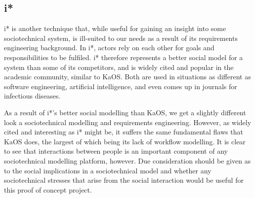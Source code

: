 \subsection{i*} %
i* is another technique that, while useful for gaining an insight into some sociotechnical system, is ill-suited to our needs as a result of its requirements engineering background\cite{Werneck2009}. In i*, actors rely on each other for goals and responsibilities to be fulfiled. i* therefore represents a better social model for a system than some of its competitors, and is widely cited and popular in the academic community, similar to KaOS. Both are used in situations as different as software engineering\cite{Almisned2010}, artificial intelligence\cite{VanDiggelen2010}, and even comes up in journals for infectious diseases\cite{Tutorial2007}. \par
As a result of i*'s better social modelling than KaOS, we get a slightly different look a sociotechnical modelling and requirements engineering. However, as widely cited and interesting as i* might be, it suffers the same fundamental flaws that KaOS does, the largest of which being its lack of workflow modelling. It is clear to see that interactions between people is an important component of any sociotechnical modelling platform, however. Due consideration should be given as to the social implications in a sociotechnical model and whether any sociotechnical stresses that arise from the social interaction would be useful for this proof of concept project. \par

